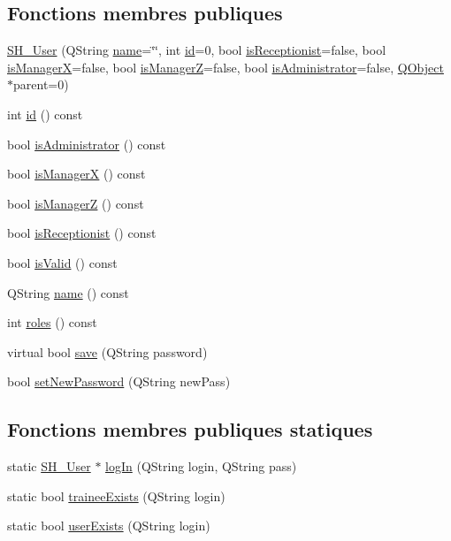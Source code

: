 \subsection*{Fonctions membres publiques}
\begin{DoxyCompactItemize}
\item 
\hyperlink{classSH__User_a96c0ebb3f11c1654935aaecb92295724}{S\-H\-\_\-\-User} (Q\-String \hyperlink{classSH__User_ae32b20d52e62ec32c1f335006f52214e}{name}=\char`\"{}\char`\"{}, int \hyperlink{classSH__User_a187ee34e1d6d3466f3852e091cdb69e9}{id}=0, bool \hyperlink{classSH__User_a6e78a5559a202eb3f2bd79e50768da7f}{is\-Receptionist}=false, bool \hyperlink{classSH__User_af5e5639aa5f7794b5b169f0ed0333268}{is\-Manager\-X}=false, bool \hyperlink{classSH__User_a763479597c54bb92ad2490826dedacfa}{is\-Manager\-Z}=false, bool \hyperlink{classSH__User_a2a9cbd9e27e5047ec108d4f373884de5}{is\-Administrator}=false, \hyperlink{classQObject}{Q\-Object} $\ast$parent=0)
\item 
int \hyperlink{classSH__User_addf3cb1d491eea2df592dee5c9081d32}{id} () const 
\item 
bool \hyperlink{classSH__User_a2a9cbd9e27e5047ec108d4f373884de5}{is\-Administrator} () const 
\item 
bool \hyperlink{classSH__User_af5e5639aa5f7794b5b169f0ed0333268}{is\-Manager\-X} () const 
\item 
bool \hyperlink{classSH__User_a763479597c54bb92ad2490826dedacfa}{is\-Manager\-Z} () const 
\item 
bool \hyperlink{classSH__User_a6e78a5559a202eb3f2bd79e50768da7f}{is\-Receptionist} () const 
\item 
bool \hyperlink{classSH__User_a07de5c02b2a02b3bb2b0aaf0886bb4d9}{is\-Valid} () const 
\item 
Q\-String \hyperlink{classSH__User_ae91e70207f4057846667af6e1c300d96}{name} () const 
\item 
int \hyperlink{classSH__User_a4b58db36176601136130aa91e87548ee}{roles} () const 
\item 
virtual bool \hyperlink{classSH__User_a372d9b8ce8edf778df1c12d3e416091f}{save} (Q\-String password)
\item 
bool \hyperlink{classSH__User_ada3160c3abf1b200646cb6f4fe5ccd72}{set\-New\-Password} (Q\-String new\-Pass)
\end{DoxyCompactItemize}
\subsection*{Fonctions membres publiques statiques}
\begin{DoxyCompactItemize}
\item 
static \hyperlink{classSH__User}{S\-H\-\_\-\-User} $\ast$ \hyperlink{classSH__User_a98e3e3ca706a6988e6d7af23ce8bb82a}{log\-In} (Q\-String login, Q\-String pass)
\item 
static bool \hyperlink{classSH__User_adfc35c967cb405f4a14886676612fbb7}{trainee\-Exists} (Q\-String login)
\item 
static bool \hyperlink{classSH__User_a64161b35866b1c635d5f4214095a2b1e}{user\-Exists} (Q\-String login)
\end{DoxyCompactItemize}
